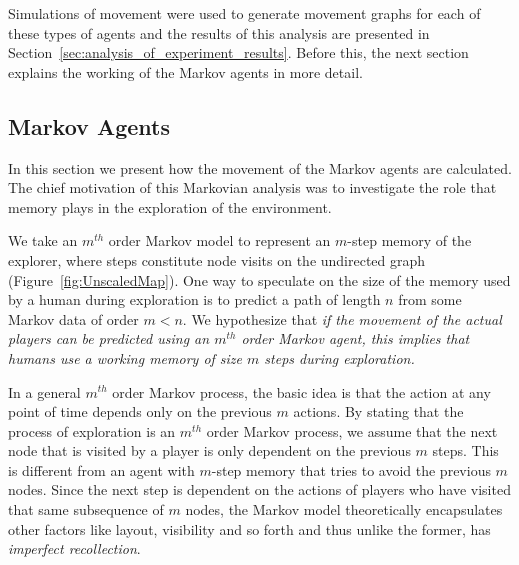 Simulations of movement were used to generate movement graphs for each of these types of agents and the results of this analysis are presented in Section~\ref{sec:analysis_of_experiment_results}. Before this, the next section explains the working of the Markov agents in more detail.

\subsection{Markov Agents}
\label{sec:Markov_data_analysis}


In this section we present how the movement of the Markov agents are calculated. The chief motivation of this Markovian analysis was to investigate the role that memory plays in the exploration of the environment.

We take an $m^{th}$ order Markov model to represent an $m$-step memory of the explorer, where steps constitute node visits on the undirected graph (Figure~\ref{fig:UnscaledMap}). One way to speculate on the size of the memory used by a human during exploration is to predict a path of length $n$ from some Markov data of order $m < n$.  We hypothesize that \emph{if the movement of the actual players can be predicted using an $m^{th}$ order Markov agent, this implies that humans use a working memory of size $m$ steps during exploration.}

In a general $m^{th}$ order Markov process, the basic idea is that the action at any point of time depends only on the previous $m$ actions. By stating that the process of exploration is an $m^{th}$ order Markov process, we assume that the next node that is visited by a player is only dependent on the previous $m$ steps. This is different from an agent with $m$-step memory that tries to avoid the previous $m$ nodes. Since the next step is dependent on the actions of players who have visited that same subsequence of $m$ nodes, the Markov model theoretically encapsulates other factors like layout, visibility and so forth and thus unlike the former, has \emph{imperfect recollection}.


